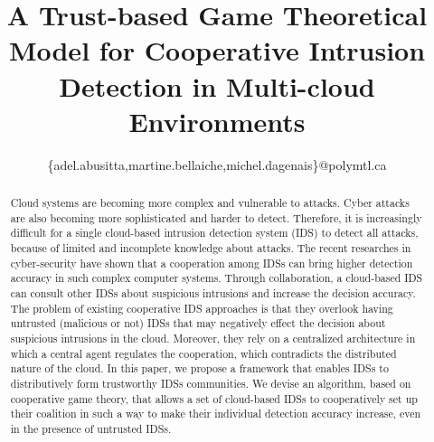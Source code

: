 \documentclass[conference]{IEEEtran}
\begin{document}
%
\title{A Trust-based Game Theoretical Model for Cooperative Intrusion Detection in Multi-cloud Environments}



\author{

\{adel.abusitta,martine.bellaiche,michel.dagenais\}@polymtl.ca}

\maketitle


\begin{abstract}
Cloud systems are becoming more complex and vulnerable to attacks. Cyber attacks are also becoming more sophisticated and harder to detect. Therefore, it is increasingly difficult for a single cloud-based intrusion detection system (IDS) to detect all attacks, because of limited and incomplete knowledge about attacks. The recent researches in cyber-security have shown that a cooperation among IDSs can bring higher detection accuracy in such complex computer systems. Through collaboration, a cloud-based IDS can consult other IDSs about suspicious intrusions and increase the decision accuracy. The problem of existing cooperative IDS approaches is that they overlook having untrusted (malicious or not) IDSs that may negatively effect the decision about suspicious intrusions in the cloud. Moreover, they rely on a centralized architecture in which a central agent regulates the cooperation, which contradicts the distributed nature of the cloud. In this paper, we propose a framework that enables IDSs to distributively form trustworthy IDSs communities. We devise an algorithm, based on cooperative game theory, that allows a set of cloud-based IDSs to cooperatively set up their coalition in such a way to make their individual detection accuracy increase, even in the presence of untrusted IDSs.

\end{abstract}
\end{document}
